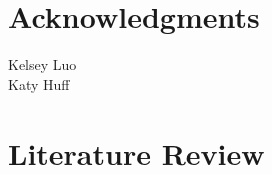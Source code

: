 \documentclass[edeposit,fullpage,11pt]{uiucthesis2018}
\title{\pygen}
\author{Samuel G. Dotson}
\begin{document}
\maketitle

\frontmatter
\begin{abstract}

Abstract.

\end{abstract}

\chapter*{Acknowledgments}

Kelsey Luo\\
Katy Huff



\tableofcontents
\listoftables
\listoffigures


\pagebreak
\mainmatter

% 

\chapter{Literature Review}

\end{document}
